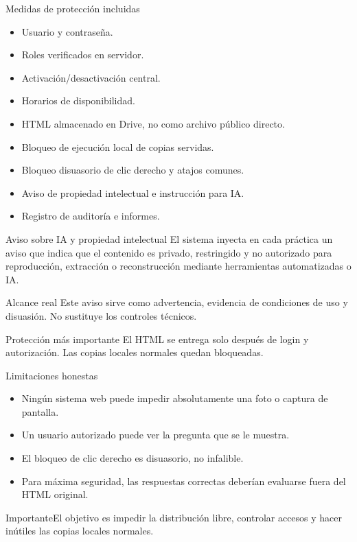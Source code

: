 \documentclass[aspectratio=169,11pt]{beamer}
\newcommand{\alertbox}[1]{\begin{block}{Importante}#1\end{block}}
\begin{document}
\begin{frame}{Medidas de protección incluidas}
\begin{itemize}
  \item Usuario y contraseña.
  \item Roles verificados en servidor.
  \item Activación/desactivación central.
  \item Horarios de disponibilidad.
  \item HTML almacenado en Drive, no como archivo público directo.
  \item Bloqueo de ejecución local de copias servidas.
  \item Bloqueo disuasorio de clic derecho y atajos comunes.
  \item Aviso de propiedad intelectual e instrucción para IA.
  \item Registro de auditoría e informes.
\end{itemize}
\end{frame}

\begin{frame}{Aviso sobre IA y propiedad intelectual}
\small
El sistema inyecta en cada práctica un aviso que indica que el contenido es privado, restringido y no autorizado para reproducción, extracción o reconstrucción mediante herramientas automatizadas o IA.

\vspace{.3cm}
\begin{block}{Alcance real}
Este aviso sirve como advertencia, evidencia de condiciones de uso y disuasión. No sustituye los controles técnicos.
\end{block}
\begin{block}{Protección más importante}
El HTML se entrega solo después de login y autorización. Las copias locales normales quedan bloqueadas.
\end{block}
\end{frame}

\begin{frame}{Limitaciones honestas}
\begin{itemize}
  \item Ningún sistema web puede impedir absolutamente una foto o captura de pantalla.
  \item Un usuario autorizado puede ver la pregunta que se le muestra.
  \item El bloqueo de clic derecho es disuasorio, no infalible.
  \item Para máxima seguridad, las respuestas correctas deberían evaluarse fuera del HTML original.
\end{itemize}
\alertbox{El objetivo es impedir la distribución libre, controlar accesos y hacer inútiles las copias locales normales.}
\end{frame}
\end{document}
